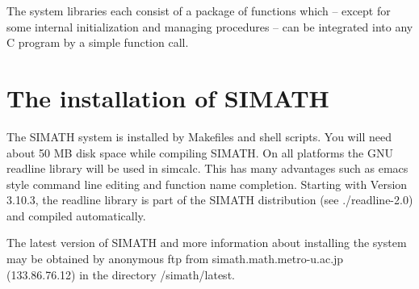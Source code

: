 The system libraries each consist of a package of functions which
-- except for some internal initialization and managing procedures -- 
can be integrated into any C pro\-gram by a simple function call.

\section{The installation of SIMATH} 

The SIMATH system is installed by Makefiles and shell scripts. You will need 
about 50 MB disk space while compiling SIMATH. 
On all platforms the GNU readline library will 
be used in simcalc. This has many advantages such as emacs style command line 
editing and function name completion. Starting with Version 3.10.3, the 
readline library is part of the SIMATH distribution (see ./readline-2.0) and 
compiled automatically. 

  The latest version of SIMATH and more information about installing the 
system may be obtained by anonymous ftp from simath.math.metro-u.ac.jp 
(133.86.76.12) in the directory /simath/latest.

% 
